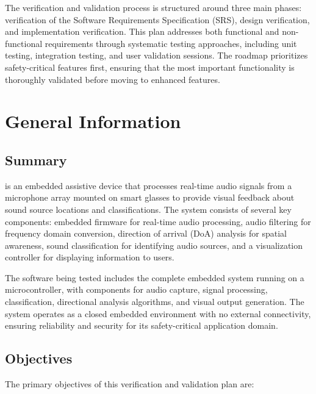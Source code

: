 \documentclass[12pt, titlepage]{article}
\begin{document}
The verification and validation process is structured around three main phases:
verification of the Software Requirements Specification (SRS), design
verification, and implementation verification. This plan addresses both
functional and non-functional requirements through systematic testing
approaches, including unit testing, integration testing, and user validation
sessions. The roadmap prioritizes safety-critical features first, ensuring that
the most important functionality is thoroughly validated before moving to
enhanced features.

\section{General Information}

\subsection{Summary}

\progname{} is an embedded assistive device that processes real-time audio
signals from a microphone array mounted on smart glasses to provide visual
feedback about sound source locations and classifications. The system consists
of several key components: embedded firmware for real-time audio processing,
audio filtering for frequency domain conversion, direction of arrival (DoA)
analysis for spatial awareness, sound classification for identifying audio
sources, and a visualization controller for displaying information to users.

The software being tested includes the complete embedded system running on a
microcontroller, with components for audio capture, signal processing,
classification, directional analysis algorithms, and visual output generation.
The system operates as a closed embedded environment with no external
connectivity, ensuring reliability and security for its safety-critical
application domain.

\subsection{Objectives}

The primary objectives of this verification and validation plan are:
\end{document}
